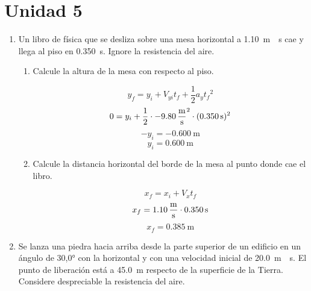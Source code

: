 \documentclass[Análisis.root.tex]{subfiles}
\begin{document}
\section{Unidad 5}

\begin{enumerate}
  \item Un libro de física que se desliza sobre una mesa horizontal a \SI{1,10}{\meter\over\second} cae y llega al piso en \SI{0,350}{\second}. Ignore la resistencia del aire.

        \begin{center}
        \end{center}

        \begin{enumerate}
          \item Calcule la altura de la mesa con respecto al piso.

                \[y_f=y_i+V_{yi}t_f+\frac{1}{2}a_y{t_f}^2\]
                \[0=y_i+\frac{1}{2}\cdot\SI{-9,80}{\meter\over\second\squared}\cdot(\SI{0,350}{\second})^2\]
                \[-y_i=\SI{-0,600}{\meter}\]
                \[y_i=\boxed{\SI{0,600}{\meter}}\]

          \item Calcule la distancia horizontal del borde de la mesa al punto donde cae el libro.

                \[x_f=x_i+V_xt_f\]
                \[x_f=\SI{1,10}{\meter\over\second}\cdot\SI{0,350}{\second}\]
                \[x_f=\boxed{\SI{0,385}{\meter}}\]
        \end{enumerate}

  \item Se lanza una piedra hacia arriba desde la parte superior de un edificio en un ángulo de \ang{30,0} con la horizontal y con una velocidad inicial de \SI{20,0}{\meter\over\second}. El punto de liberación está a \SI{45,0}{\meter} respecto de la superficie de la Tierra. Considere despreciable la resistencia del aire.


\end{enumerate}
\end{document}
